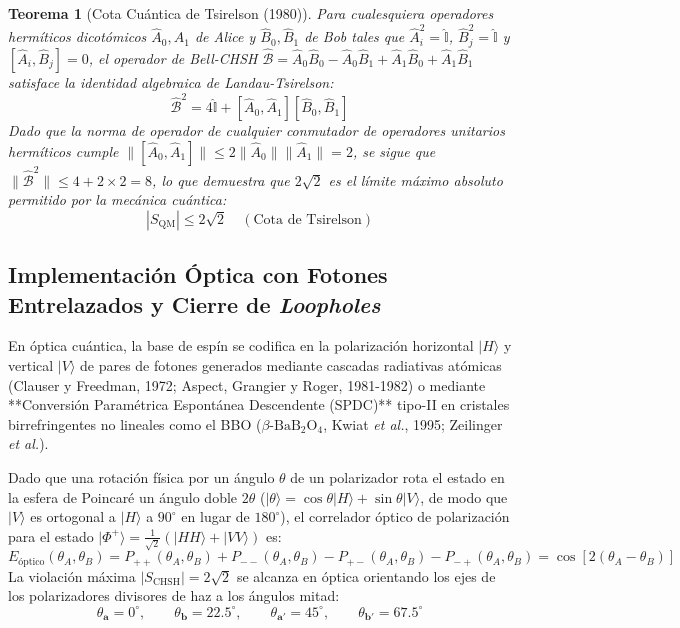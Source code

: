 \documentclass[11pt,a4paper]{book}
\newtheorem{teorema}{Teorema}[chapter]
\begin{document}
\begin{teorema}[Cota Cuántica de Tsirelson (1980)]
Para cualesquiera operadores hermíticos dicotómicos $\hat{A}_0, \hat{A}_1$ de Alice y $\hat{B}_0, \hat{B}_1$ de Bob tales que $\hat{A}_i^2 = \hat{\mathbb{I}}$, $\hat{B}_j^2 = \hat{\mathbb{I}}$ y $[\hat{A}_i, \hat{B}_j] = 0$, el operador de Bell-CHSH $\hat{\mathcal{B}} = \hat{A}_0 \hat{B}_0 - \hat{A}_0 \hat{B}_1 + \hat{A}_1 \hat{B}_0 + \hat{A}_1 \hat{B}_1$ satisface la identidad algebraica de Landau-Tsirelson:
\begin{equation}
\hat{\mathcal{B}}^2 = 4\hat{\mathbb{I}} + [\hat{A}_0, \hat{A}_1][\hat{B}_0, \hat{B}_1]
\end{equation}
Dado que la norma de operador de cualquier conmutador de operadores unitarios hermíticos cumple $\|[\hat{A}_0, \hat{A}_1]\| \leq 2\|\hat{A}_0\|\|\hat{A}_1\| = 2$, se sigue que $\|\hat{\mathcal{B}}^2\| \leq 4 + 2 \times 2 = 8$, lo que demuestra que $2\sqrt{2}$ es el límite máximo absoluto permitido por la mecánica cuántica:
\begin{equation}
|S_{\text{QM}}| \leq 2\sqrt{2} \quad (\text{Cota de Tsirelson})
\end{equation}
\end{teorema}

\subsection[Implementación óptica y cierre de resquicios]{Implementación Óptica con Fotones Entrelazados y Cierre de \textit{Loopholes}}

En óptica cuántica, la base de espín se codifica en la polarización horizontal $|H\rangle$ y vertical $|V\rangle$ de pares de fotones generados mediante cascadas radiativas atómicas (Clauser y Freedman, 1972; Aspect, Grangier y Roger, 1981-1982) o mediante **Conversión Paramétrica Espontánea Descendente (SPDC)** tipo-II en cristales birrefringentes no lineales como el BBO ($\beta$-$\text{BaB}_2\text{O}_4$, Kwiat \textit{et al.}, 1995; Zeilinger \textit{et al.}).

Dado que una rotación física por un ángulo $\theta$ de un polarizador rota el estado en la esfera de Poincaré un ángulo doble $2\theta$ ($|\theta\rangle = \cos\theta|H\rangle + \sin\theta|V\rangle$, de modo que $|V\rangle$ es ortogonal a $|H\rangle$ a $90^\circ$ en lugar de $180^\circ$), el correlador óptico de polarización para el estado $|\Phi^+\rangle = \frac{1}{\sqrt{2}}(|HH\rangle + |VV\rangle)$ es:
\begin{equation}
E_{\text{óptico}}(\theta_A, \theta_B) = P_{++}(\theta_A, \theta_B) + P_{--}(\theta_A, \theta_B) - P_{+-}(\theta_A, \theta_B) - P_{-+}(\theta_A, \theta_B) = \cos\left[2(\theta_A - \theta_B)\right]
\end{equation}
La violación máxima $|S_{\text{CHSH}}| = 2\sqrt{2}$ se alcanza en óptica orientando los ejes de los polarizadores divisores de haz a los ángulos mitad:
\begin{equation}
\theta_{\mathbf{a}} = 0^\circ, \qquad \theta_{\mathbf{b}} = 22.5^\circ, \qquad \theta_{\mathbf{a}'} = 45^\circ, \qquad \theta_{\mathbf{b}'} = 67.5^\circ
\end{equation}
\end{document}
